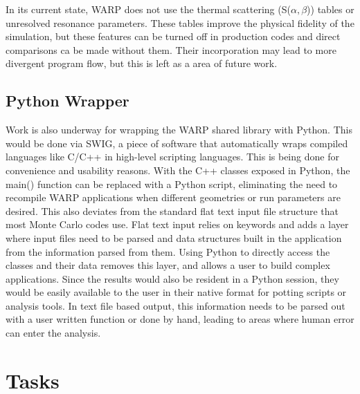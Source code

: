 In its current state, WARP does not use the thermal scattering (S($\alpha,$$\beta$)) tables or unresolved resonance parameters.   These tables improve the physical fidelity of the simulation, but these features can be turned off in production codes and direct comparisons ca be made without them.  Their incorporation may lead to more divergent program flow, but this is left as a area of future work.

\subsection{Python Wrapper}

Work is also underway for wrapping the WARP shared library with Python.  This would be done via SWIG, a piece of software that automatically wraps compiled languages like C/C++ in high-level scripting languages.  This is being done for convenience and usability reasons.  With the C++ classes exposed in Python, the main() function can be replaced with a Python script, eliminating the need to recompile WARP applications when different geometries or run parameters are desired.  This also deviates from the standard flat text input file structure that most Monte Carlo codes use.  Flat text input relies on keywords and adds a layer where input files need to be parsed and data structures built in the application from the information parsed from them.  Using Python to directly access the classes and their data removes this layer, and allows a user to build complex applications.  Since the results would also be resident in a Python session, they would be easily available to the user in their native format for potting scripts or analysis tools.  In text file based output, this information needs to be parsed out with a user written function or done by hand, leading to areas where human error can enter the analysis.


\section{Tasks}

